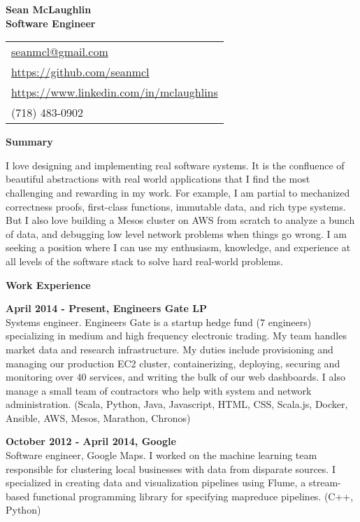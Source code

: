 \documentclass[a4paper,12pt,final]{memoir}
\newcommand{\SmallSep}{\vspace{0.5em}}
\newcommand{\CVSection}[1]
{\Large\textbf{#1}\par
  \SmallSep\normalsize\normalfont}
\newcommand{\CVItem}[1]
{\textbf{\color{RoyalBlue} #1}}
\newcommand{\CPP}{C\hspace{-2pt}+\hspace{-4pt}+}
\begin{document}

\Huge\bfseries {\color{RoyalBlue}Sean McLaughlin}\\
\large\bfseries {\color{RoyalBlue}Software Engineer}
\normalsize\normalfont

\begin{flushright}\small
  \vspace{-3em}
  \begin{tabular}{l}
    \url{seanmcl@gmail.com}\\
    \url{https://github.com/seanmcl}\\
    \url{https://www.linkedin.com/in/mclaughlins}\\
    (718) 483-0902
  \end{tabular}
\end{flushright}\normalsize

\normalsize\normalfont

\vspace{-1em}

\CVSection{Summary}
I love designing and implementing real software systems.  It is the
confluence of beautiful abstractions with real world applications that
I find the most challenging and rewarding in my work.  For example, I
am partial to mechanized correctness proofs, first-class functions,
immutable data, and rich type systems.  But I also love building a
Mesos cluster on AWS from scratch to analyze a bunch of data, and
debugging low level network problems when things go wrong.
I am seeking a position where I can use my enthusiasm,
knowledge, and experience at all levels of the software stack to solve
hard real-world problems.

\CVSection{Work Experience}
\CVItem{April 2014 - Present, Engineers Gate LP}\\
Systems engineer.  Engineers Gate is a startup hedge fund (7
engineers) specializing in medium and high frequency electronic
trading.  My team handles market data and research infrastructure.  My
duties include provisioning and managing our production EC2 cluster,
containerizing, deploying, securing and monitoring over 40
services, and writing the bulk of our web dashboards. I also manage a small
team of contractors who help with system and network administration.
(Scala, Python, Java, Javascript, HTML, CSS, Scala.js, Docker, Ansible, AWS,
Mesos, Marathon, Chronos)
\SmallSep

\CVItem{October 2012 - April 2014, Google}\\
Software engineer, Google Maps.  I worked on the machine learning
team responsible for clustering local businesses with data
from disparate sources.  I specialized in creating data and visualization
pipelines using Flume, a stream-based functional programming library
for specifying mapreduce pipelines.  (\CPP, Python)
\SmallSep
\end{document}
